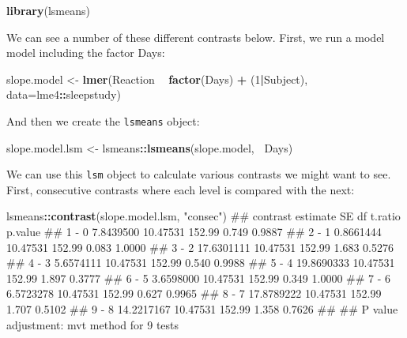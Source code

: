 \documentclass[]{article}
\newenvironment{Shaded}{\begin{snugshade}}{\end{snugshade}}
\newcommand{\KeywordTok}[1]{\textcolor[rgb]{0.13,0.29,0.53}{\textbf{#1}}}
\newcommand{\DataTypeTok}[1]{\textcolor[rgb]{0.13,0.29,0.53}{#1}}
\newcommand{\DecValTok}[1]{\textcolor[rgb]{0.00,0.00,0.81}{#1}}
\newcommand{\StringTok}[1]{\textcolor[rgb]{0.31,0.60,0.02}{#1}}
\newcommand{\OperatorTok}[1]{\textcolor[rgb]{0.81,0.36,0.00}{\textbf{#1}}}
\newcommand{\NormalTok}[1]{#1}
\theoremstyle{definition}
\theoremstyle{definition}
\theoremstyle{definition}
\theoremstyle{remark}
\begin{document}
\begin{Shaded}
\begin{Highlighting}[]
\KeywordTok{library}\NormalTok{(lsmeans)}
\end{Highlighting}
\end{Shaded}

We can see a number of these different contrasts below. First, we run a
model model including the factor Days:

\begin{Shaded}
\begin{Highlighting}[]
\NormalTok{slope.model <-}\StringTok{ }\KeywordTok{lmer}\NormalTok{(Reaction }\OperatorTok{~}\StringTok{ }\KeywordTok{factor}\NormalTok{(Days) }\OperatorTok{+}\StringTok{ }\NormalTok{(}\DecValTok{1}\OperatorTok{|}\NormalTok{Subject),}
                    \DataTypeTok{data=}\NormalTok{lme4}\OperatorTok{::}\NormalTok{sleepstudy)}
\end{Highlighting}
\end{Shaded}

And then we create the \texttt{lsmeans} object:

\begin{Shaded}
\begin{Highlighting}[]
\NormalTok{slope.model.lsm <-}\StringTok{ }\NormalTok{lsmeans}\OperatorTok{::}\KeywordTok{lsmeans}\NormalTok{(slope.model, }\OperatorTok{~}\NormalTok{Days)}
\end{Highlighting}
\end{Shaded}

We can use this \texttt{lsm} object to calculate various contrasts we
might want to see. First, consecutive contrasts where each level is
compared with the next:

\begin{Shaded}
\begin{Highlighting}[]
\NormalTok{lsmeans}\OperatorTok{::}\KeywordTok{contrast}\NormalTok{(slope.model.lsm, }\StringTok{"consec"}\NormalTok{)}
\NormalTok{##  contrast   estimate       SE     df t.ratio p.value}
\NormalTok{##  1 - 0     7.8439500 10.47531 152.99   0.749  0.9887}
\NormalTok{##  2 - 1     0.8661444 10.47531 152.99   0.083  1.0000}
\NormalTok{##  3 - 2    17.6301111 10.47531 152.99   1.683  0.5276}
\NormalTok{##  4 - 3     5.6574111 10.47531 152.99   0.540  0.9988}
\NormalTok{##  5 - 4    19.8690333 10.47531 152.99   1.897  0.3777}
\NormalTok{##  6 - 5     3.6598000 10.47531 152.99   0.349  1.0000}
\NormalTok{##  7 - 6     6.5723278 10.47531 152.99   0.627  0.9965}
\NormalTok{##  8 - 7    17.8789222 10.47531 152.99   1.707  0.5102}
\NormalTok{##  9 - 8    14.2217167 10.47531 152.99   1.358  0.7626}
\NormalTok{## }
\NormalTok{## P value adjustment: mvt method for 9 tests}
\end{Highlighting}
\end{Shaded}
\end{document}
